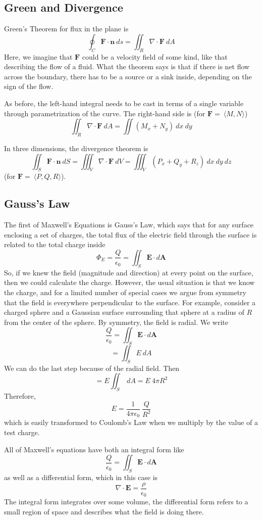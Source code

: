 \documentclass[11pt, oneside]{article}   	%
\begin{document}
\subsection*{Green and Divergence}
Green's Theorem for flux in the plane is
\[ \oint_C \mathbf{F} \cdot \mathbf{n} \ ds = \iint_R \nabla \cdot \mathbf{F} \ dA \]
Here, we imagine that $\mathbf{F}$ could be a velocity field of some kind, like that describing the flow of a fluid.  What the theorem says is that if there is net flow across the boundary, there has to be a source or a sink inside, depending on the sign of the flow.

As before, the left-hand integral needs to be cast in terms of a single variable through parametrization of the curve.  The right-hand side is (for $\mathbf{F} = \ \langle M, N \rangle$)
\[ \iint_R \nabla \cdot \mathbf{F} \ dA = \iint (M_x + N_y) \ dx \ dy   \]

In three dimensions, the divergence theorem is
\[ \iint_S \mathbf{F} \cdot \mathbf{n} \ dS = \iiint_V \nabla \cdot \mathbf{F} \ dV = \iiint_V (P_x + Q_y + R_z) \ dx \ dy \ dz \]
(for $\mathbf{F} = \ \langle P,Q,R \rangle$).

\subsection*{Gauss's Law}
The first of Maxwell's Equations is Gauss's Law, which says that for any surface enclosing a set of charges, the total flux of the electric field through the surface is related to the total charge inside
\[ \Phi_E = \frac{Q}{\epsilon_0} = \iint_S \mathbf{E} \cdot d\mathbf{A} \]
So, if we knew the field (magnitude and direction) at every point on the surface, then we could calculate the charge.  However, the usual situation is that we know the charge, and for a limited number of special cases we argue from symmetry that the field is everywhere perpendicular to the surface.  For example, consider a charged sphere and a Gaussian surface surrounding that sphere at a radius of $R$ from the center of the sphere.  By symmetry, the field is radial.  We write
\[ \frac{Q}{\epsilon_0} = \iint_S \mathbf{E} \cdot d\mathbf{A} \]
\[ = \iint_S E \ dA \]
We can do the last step because of the radial field.  Then
\[ = E \iint_S \ dA = E \ 4 \pi R^2 \]
Therefore,
\[ E = \frac{1}{4 \pi \epsilon_0} \ \frac{Q}{R^2} \]
which is easily transformed to Coulomb's Law when we multiply by the value of a test charge.

All of Maxwell's equations have both an integral form like
\[ \frac{Q}{\epsilon_0} = \iint_S \mathbf{E} \cdot d\mathbf{A} \]
as well as a differential form, which in this case is
\[ \nabla \cdot \mathbf{E} = \frac{\rho}{\epsilon_0} \]
The integral form integrates over some volume, the differential form refers to a small region of space and describes what the field is doing there.
\end{document}
